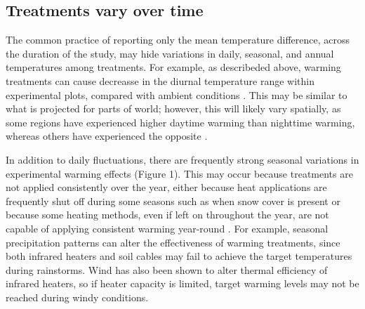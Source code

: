 \documentclass{article}
\begin{document}
\subsection* {Treatments vary over time}
The common practice of reporting only the mean temperature difference, across the duration of the study, may hide variations in daily, seasonal, and annual temperatures among treatments. For example, as describeded above, warming treatments can cause decreasse in the diurnal temperature range within experimental plots, compared with ambient conditions \citep{hoeppner2012}. This may be similar to what is projected for parts of world; however, this will likely vary spatially, as some regions have experienced higher daytime warming than nighttime warming, whereas others have experienced the opposite \citep{ipcc2013}. 
\par In addition to daily fluctuations, there are frequently strong seasonal variations in experimental warming effects (Figure 1). This may occur because treatments are not applied consistently over the year, either because heat applications are frequently shut off during some seasons such as when snow cover is present or because some heating methods, even if left on throughout the year, are not capable of applying consistent warming year-round \citep[e.g.][]{clark2014a,clark2014b,hagedorn2010}. For example, seasonal precipitation patterns can alter the effectiveness of warming treatments, since both infrared heaters and soil cables may fail to achieve the target temperatures during  rainstorms\citep{peterjohn1993,hoeppner2012}. Wind has also been shown to alter thermal efficiency of infrared heaters, so if heater capacity is limited, target warming levels may not be reached during windy conditions\cite{kimball2005,kimball2008}.
\end{document}

